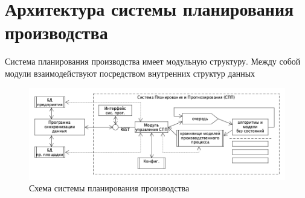 \section{Архитектура системы планирования производства}
\indent Система планирования производства имеет модульную структуру.
Между собой модули взаимодействуют посредством внутренних структур данных

\begin{figure}[ht]
	\centering
	\includegraphics[width=\linewidth]{pics/archSPP.png}
	\caption{Схема системы планирования производства \cite{niorkpz}}
	\label{fig:archSPP}
\end{figure}


